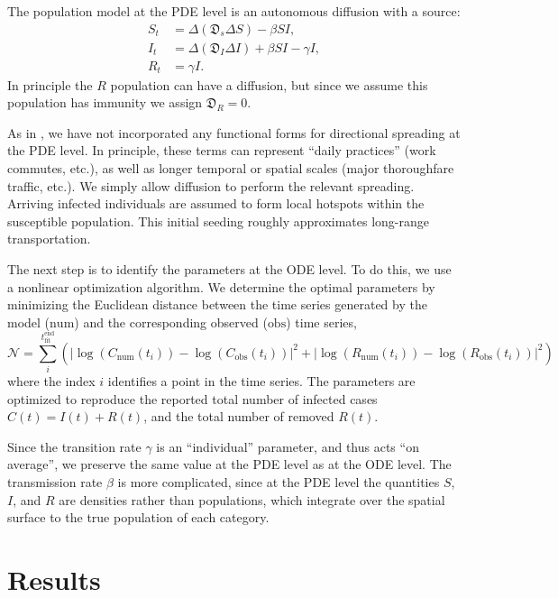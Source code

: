 \documentclass[11pt]{article}
\newcommand{\N}{\mathcal{N}}
\newcommand{\num}{\text{num}}
\newcommand{\obs}{\text{obs}}
\newcommand{\D}{\mathfrak{D}}
\begin{document}
The population model at the PDE level is an autonomous diffusion with a source:
\begin{align}
	S_t	&=	\Delta (\D_s \Delta S) - \beta SI,	\\
	I_t	&=	\Delta (\D_I \Delta I) + \beta SI - \gamma I,	\\
	R_t	&=	\gamma I.
\end{align}
In principle the $R$ population can have a diffusion, but since we assume this population has immunity we assign $\D_R = 0$.

As in \cite{Kevrekidis_2021}, we have not incorporated any functional forms for directional spreading at the PDE level.
In principle, these terms can represent ``daily practices'' (work commutes, etc.), as well as longer temporal or spatial scales (major thoroughfare traffic, etc.).
We simply allow diffusion to perform the relevant spreading.
Arriving infected individuals are assumed to form local hotspots within the susceptible population.
This initial seeding roughly approximates long-range transportation.

The next step is to identify the parameters at the ODE level.
To do this, we use a nonlinear optimization algorithm.
We determine the optimal parameters by minimizing the Euclidean distance between the time series generated by the model ($\num$) and the corresponding observed ($\obs$) time series,
\begin{equation} \label{eq:obj}
	\N = \sum_i^{t_\text{fit}^\text{end}} \left( \left| \log(C_\num (t_i)) - \log(C_\obs (t_i)) \right|^2 + \left| \log(R_\num (t_i)) - \log(R_\obs (t_i)) \right|^2 \right)
\end{equation}
where the index $i$ identifies a point in the time series.
The parameters are optimized to reproduce the reported total number of infected cases $C(t) = I(t) + R(t)$, and the total number of removed $R(t)$.

Since the transition rate $\gamma$ is an ``individual'' parameter, and thus acts ``on average'', we preserve the same value at the PDE level as at the ODE level.
The transmission rate $\beta$ is more complicated, since at the PDE level the quantities $S$, $I$, and $R$ are densities rather than populations,
which integrate over the spatial surface to the true population of each category.

\section{Results}
\end{document}

